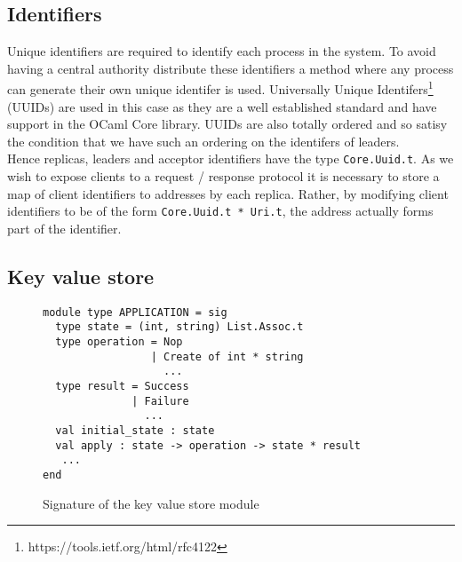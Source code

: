 \subsection{Identifiers}

Unique identifiers are required to identify each process in the system. To avoid having a central authority distribute these identifiers a method where any process can generate their own unique identifer is used. Universally Unique Identifers\footnote{https://tools.ietf.org/html/rfc4122} (UUIDs) are used in this case as they are a well established standard and have support in the OCaml Core library. UUIDs are also totally ordered and so satisy the condition that we have such an ordering on the identifers of leaders. \\

Hence replicas, leaders and acceptor identifiers have the type \texttt{Core.Uuid.t}. As we wish to expose clients to a request / response protocol it is necessary to store a map of client identifiers to addresses by each replica. Rather, by modifying client identifiers to be of the form \texttt{Core.Uuid.t * Uri.t}, the address actually forms part of the identifier.

\subsection{Key value store}

\begin{figure}
  \begin{lstlisting}
module type APPLICATION = sig
  type state = (int, string) List.Assoc.t
  type operation = Nop                  
                 | Create of int * string  
                   ...          
  type result = Success 
              | Failure
                ...          
  val initial_state : state
  val apply : state -> operation -> state * result
   ...
end
  \end{lstlisting}
    \caption{Signature of the key value store module}
    \label{fig:key-value-store}
  \centering
\end{figure}

